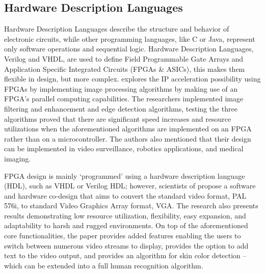 \subsection{Hardware Description Languages}
\par	Hardware Description Languages describe the structure and behavior of electronic circuits, while other programming languages, like C or Java, represent only software operations and sequential logic. Hardware Description Languages, Verilog and VHDL, are used to define Field Programmable Gate Arrays and Application Specific Integrated Circuits (FPGAs \& ASICs), this makes them flexible in design, but more complex. \cite{twelve} explores the IP acceleration possibility using FPGAs by implementing image processing algorithms by making use of an FPGA’s parallel computing capabilities. The researchers implemented image filtering and enhancement and edge detection algorithms, testing the three algorithms proved that there are significant speed increases and resource utilizations when the aforementioned algorithms are implemented on an FPGA rather than on a microcontroller. The authors also mentioned that their design can be implemented in video surveillance, robotics applications, and medical imaging. \newline
\par FPGA design is mainly ‘programmed’ using a hardware description language (HDL), such as VHDL or Verilog HDL; however, scientists of \cite{two} propose a software and hardware co-design that aims to convert the standard video format, PAL 576i, to standard Video Graphics Array format, VGA. The research also presents results demonstrating low resource utilization, flexibility, easy expansion, and adaptability to harsh and rugged environments. On top of the aforementioned core functionalities, the paper provides added features enabling the users to switch between numerous video streams to display, provides the option to add text to the video output, and provides an algorithm for skin color detection – which can be extended into a full human recognition algorithm. \newline
